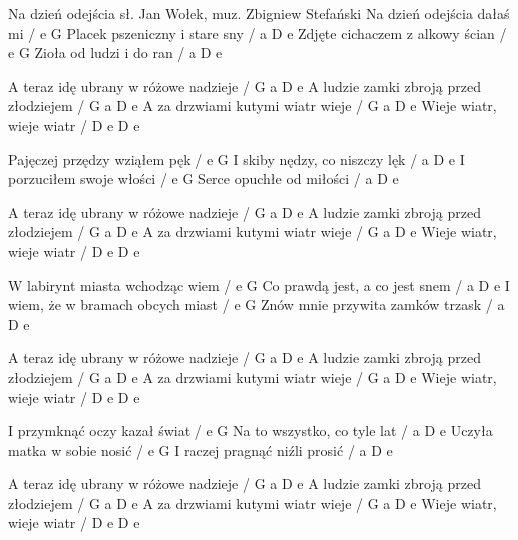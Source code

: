 Na dzień odejścia
sł. Jan Wołek, muz. Zbigniew Stefański
Na dzień odejścia dałaś mi / e G
Placek pszeniczny i stare sny / a D e
Zdjęte cichaczem z alkowy ścian / e G
Zioła od ludzi i do ran / a D e

A teraz idę ubrany w różowe nadzieje / G a D e
A ludzie zamki zbroją przed złodziejem / G a D e
A za drzwiami kutymi wiatr wieje / G a D e
Wieje wiatr, wieje wiatr / D e D e

Pajęczej przędzy wziąłem pęk / e G
I skiby nędzy, co niszczy lęk / a D e
I porzuciłem swoje włości / e G
Serce opuchłe od miłości / a D e

A teraz idę ubrany w różowe nadzieje / G a D e
A ludzie zamki zbroją przed złodziejem / G a D e
A za drzwiami kutymi wiatr wieje / G a D e
Wieje wiatr, wieje wiatr / D e D e

W labirynt miasta wchodząc wiem / e G
Co prawdą jest, a co jest snem / a D e
I wiem, że w bramach obcych miast / e G
Znów mnie przywita zamków trzask / a D e

A teraz idę ubrany w różowe nadzieje / G a D e
A ludzie zamki zbroją przed złodziejem / G a D e
A za drzwiami kutymi wiatr wieje / G a D e
Wieje wiatr, wieje wiatr / D e D e

I przymknąć oczy kazał świat / e G
Na to wszystko, co tyle lat / a D e
Uczyła matka w sobie nosić / e G
I raczej pragnąć niźli prosić / a D e

A teraz idę ubrany w różowe nadzieje / G a D e
A ludzie zamki zbroją przed złodziejem / G a D e
A za drzwiami kutymi wiatr wieje / G a D e
Wieje wiatr, wieje wiatr / D e D e